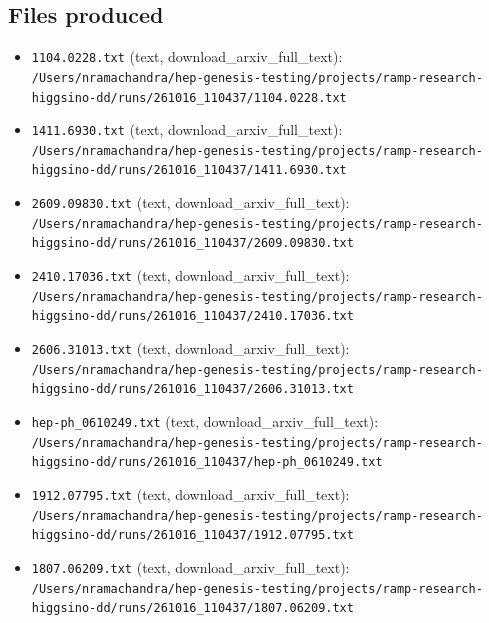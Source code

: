 \documentclass[11pt,a4paper]{article}
\begin{document}
\subsection{Files produced}
\begin{itemize}
  \item \texttt{1104.0228.txt} (text, download\_arxiv\_full\_text): \texttt{/\allowbreak{}Users/\allowbreak{}nramachandra/\allowbreak{}hep-genesis-testing/\allowbreak{}projects/\allowbreak{}ramp-research-higgsino-dd/\allowbreak{}runs/\allowbreak{}261016\_\allowbreak{}110437/\allowbreak{}1104.0228.txt}
  \item \texttt{1411.6930.txt} (text, download\_arxiv\_full\_text): \texttt{/\allowbreak{}Users/\allowbreak{}nramachandra/\allowbreak{}hep-genesis-testing/\allowbreak{}projects/\allowbreak{}ramp-research-higgsino-dd/\allowbreak{}runs/\allowbreak{}261016\_\allowbreak{}110437/\allowbreak{}1411.6930.txt}
  \item \texttt{2609.09830.txt} (text, download\_arxiv\_full\_text): \texttt{/\allowbreak{}Users/\allowbreak{}nramachandra/\allowbreak{}hep-genesis-testing/\allowbreak{}projects/\allowbreak{}ramp-research-higgsino-dd/\allowbreak{}runs/\allowbreak{}261016\_\allowbreak{}110437/\allowbreak{}2609.09830.txt}
  \item \texttt{2410.17036.txt} (text, download\_arxiv\_full\_text): \texttt{/\allowbreak{}Users/\allowbreak{}nramachandra/\allowbreak{}hep-genesis-testing/\allowbreak{}projects/\allowbreak{}ramp-research-higgsino-dd/\allowbreak{}runs/\allowbreak{}261016\_\allowbreak{}110437/\allowbreak{}2410.17036.txt}
  \item \texttt{2606.31013.txt} (text, download\_arxiv\_full\_text): \texttt{/\allowbreak{}Users/\allowbreak{}nramachandra/\allowbreak{}hep-genesis-testing/\allowbreak{}projects/\allowbreak{}ramp-research-higgsino-dd/\allowbreak{}runs/\allowbreak{}261016\_\allowbreak{}110437/\allowbreak{}2606.31013.txt}
  \item \texttt{hep-ph\_\allowbreak{}0610249.txt} (text, download\_arxiv\_full\_text): \texttt{/\allowbreak{}Users/\allowbreak{}nramachandra/\allowbreak{}hep-genesis-testing/\allowbreak{}projects/\allowbreak{}ramp-research-higgsino-dd/\allowbreak{}runs/\allowbreak{}261016\_\allowbreak{}110437/\allowbreak{}hep-ph\_\allowbreak{}0610249.txt}
  \item \texttt{1912.07795.txt} (text, download\_arxiv\_full\_text): \texttt{/\allowbreak{}Users/\allowbreak{}nramachandra/\allowbreak{}hep-genesis-testing/\allowbreak{}projects/\allowbreak{}ramp-research-higgsino-dd/\allowbreak{}runs/\allowbreak{}261016\_\allowbreak{}110437/\allowbreak{}1912.07795.txt}
  \item \texttt{1807.06209.txt} (text, download\_arxiv\_full\_text): \texttt{/\allowbreak{}Users/\allowbreak{}nramachandra/\allowbreak{}hep-genesis-testing/\allowbreak{}projects/\allowbreak{}ramp-research-higgsino-dd/\allowbreak{}runs/\allowbreak{}261016\_\allowbreak{}110437/\allowbreak{}1807.06209.txt}
\end{itemize}
\end{document}
